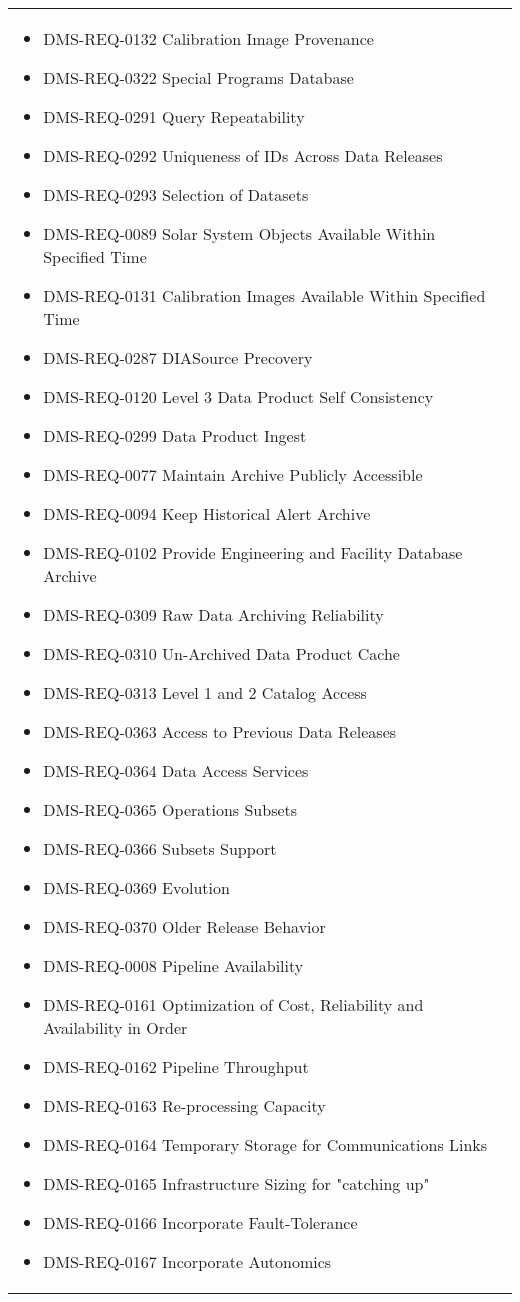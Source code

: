 \begin{xtabular}{lp{0.7\textwidth}}
\begin{itemize}
\item DMS-REQ-0132 Calibration Image Provenance
\item DMS-REQ-0322 Special Programs Database
\item DMS-REQ-0291 Query Repeatability
\item DMS-REQ-0292 Uniqueness of IDs Across Data Releases
\item DMS-REQ-0293 Selection of Datasets
\item DMS-REQ-0089 Solar System Objects Available Within Specified Time
\item DMS-REQ-0131 Calibration Images Available Within Specified Time
\item DMS-REQ-0287 DIASource Precovery
\item DMS-REQ-0120 Level 3 Data Product Self Consistency
\item DMS-REQ-0299 Data Product Ingest
\item DMS-REQ-0077 Maintain Archive Publicly Accessible
\item DMS-REQ-0094 Keep Historical Alert Archive
\item DMS-REQ-0102 Provide Engineering and Facility Database Archive
\item DMS-REQ-0309 Raw Data Archiving Reliability
\item DMS-REQ-0310 Un-Archived Data Product Cache
\item DMS-REQ-0313 Level 1 and 2 Catalog Access
\item DMS-REQ-0363 Access to Previous Data Releases
\item DMS-REQ-0364 Data Access Services
\item DMS-REQ-0365 Operations Subsets
\item DMS-REQ-0366 Subsets Support
\item DMS-REQ-0369 Evolution
\item DMS-REQ-0370 Older Release Behavior
\item DMS-REQ-0008 Pipeline Availability
\item DMS-REQ-0161 Optimization of Cost, Reliability and Availability in Order
\item DMS-REQ-0162 Pipeline Throughput
\item DMS-REQ-0163 Re-processing Capacity
\item DMS-REQ-0164 Temporary Storage for Communications Links
\item DMS-REQ-0165 Infrastructure Sizing for "catching up"
\item DMS-REQ-0166 Incorporate Fault-Tolerance
\item DMS-REQ-0167 Incorporate Autonomics

\end{itemize}
\end{xtabular}
